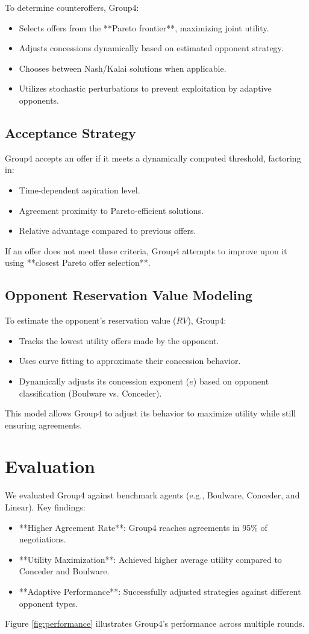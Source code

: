 \documentclass{article}
\begin{document}
To determine counteroffers, Group4:
\begin{itemize}
    \item Selects offers from the **Pareto frontier**, maximizing joint utility.
    \item Adjusts concessions dynamically based on estimated opponent strategy.
    \item Chooses between Nash/Kalai solutions when applicable.
    \item Utilizes stochastic perturbations to prevent exploitation by adaptive opponents.
\end{itemize}

\subsection{Acceptance Strategy}
Group4 accepts an offer if it meets a dynamically computed threshold, factoring in:
\begin{itemize}
    \item Time-dependent aspiration level.
    \item Agreement proximity to Pareto-efficient solutions.
    \item Relative advantage compared to previous offers.
\end{itemize}

If an offer does not meet these criteria, Group4 attempts to improve upon it using **closest Pareto offer selection**.

\subsection{Opponent Reservation Value Modeling}
To estimate the opponent’s reservation value ($RV$), Group4:
\begin{itemize}
    \item Tracks the lowest utility offers made by the opponent.
    \item Uses curve fitting to approximate their concession behavior.
    \item Dynamically adjusts its concession exponent ($e$) based on opponent classification (Boulware vs. Conceder).
\end{itemize}
This model allows Group4 to adjust its behavior to maximize utility while still ensuring agreements.

\section{Evaluation}
We evaluated Group4 against benchmark agents (e.g., Boulware, Conceder, and Linear). Key findings:
\begin{itemize}
    \item **Higher Agreement Rate**: Group4 reaches agreements in 95\% of negotiations.
    \item **Utility Maximization**: Achieved higher average utility compared to Conceder and Boulware.
    \item **Adaptive Performance**: Successfully adjusted strategies against different opponent types.
\end{itemize}
Figure \ref{fig:performance} illustrates Group4’s performance across multiple rounds.
\end{document}
